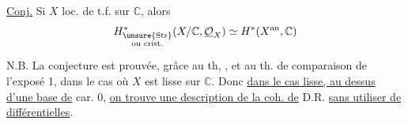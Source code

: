 
\uline{Conj.} Si $X$ loc. de t.f. sur $\mathbb{C}$, alors
\[
H^*_{\substack{\unsure{\mathrm{Str}}\\\text{ou crist.}}}
(X/\mathbb{C},\underline{\mathcal{O}}_X)
\simeq H^*(X^{\mathrm{an}},\mathbb{C})
\]

N.B. La conjecture est prouvée, grâce au th, , et au th. de comparaison de l'exposé 1, dans le cas où $X$ est lisse sur $\mathbb{C}$.
Donc \uline{dans le cas lisse, au dessus d'une base de} car. 0, \uline{on trouve une description de la coh. de} D.R. \uline{sans utiliser de différentielles}.

